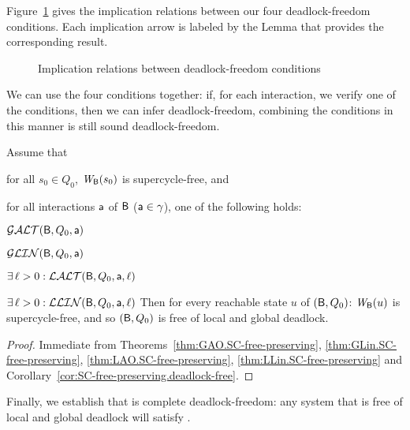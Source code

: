 

Figure~\ref{fig:implications} gives the implication relations between our four deadlock-freedom conditions.
Each implication arrow is labeled by the Lemma that provides the corresponding result.
\begin{figure}[ht]
\begin{center}
\scalebox{0.8}{}
\caption{Implication relations between deadlock-freedom conditions}
\label{fig:implications}
\end{center}
\end{figure}


We can use the four conditions together: if, for each interaction, we verify one of the conditions, then we can infer deadlock-freedom, \ie combining the conditions in this manner is still sound \wrt deadlock-freedom.

\begin{theorem}
\label{theorem:local.deadlock-free}
Assume that
\bn
\item \label{theorem:local.deadlock-free.initial}
      for all $s_0 \in Q_0$, $\mathit{W}_{\mathsf{B}}({s_0})$ is supercycle-free, and
\item \label{theorem:local.deadlock-free.scfPres}
      for all interactions $\mathsf{a}$ of $\mathsf{B}$ (\ie $\mathsf{a} \in \gamma$), one of
      the following holds:
      \bn
      \item $\mathcal{GALT}(\mathsf{B},Q_0,\mathsf{a})$
      \item $\mathcal{GLIN}(\mathsf{B},Q_0,\mathsf{a})$
      \item $\exists\, \ell > 0: \mathcal{LALT}(\mathsf{B},Q_0,\mathsf{a},\ell)$ 
      \item $\exists\, \ell > 0: \mathcal{LLIN}(\mathsf{B},Q_0,\mathsf{a},\ell)$ 
      \en
\en
Then for every reachable state $u$ of $(\mathsf{B}, Q_0)$:  $\mathit{W}_{\mathsf{B}}({u})$ is supercycle-free, and so 
$(\mathsf{B}, Q_0)$ is free of local and global deadlock.
\end{theorem}
%
\begin{proof}
Immediate from
Theorems~\ref{thm:GAO.SC-free-preserving}, \ref{thm:GLin.SC-free-preserving}, \ref{thm:LAO.SC-free-preserving}, \ref{thm:LLin.SC-free-preserving}
and Corollary~\ref{cor:SC-free-preserving.deadlock-free}.
\end{proof}




Finally, we establish that \GAO is complete \wrt deadlock-freedom: any system that is free of local and global deadlock will satisfy \GAO.

